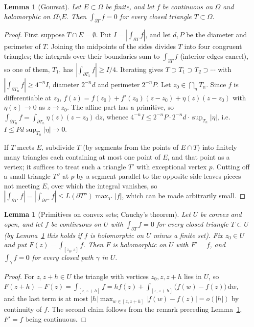\documentclass[11pt]{article}
\newtheorem{lemma}[theorem]{Lemma}
\theoremstyle{definition}
\newcommand{\dd}{\,\mathrm{d}}
\begin{document}
\begin{lemma}[Goursat]\label{lem:goursat}
Let $E\subset\Omega$ be finite, and let $f$ be continuous on $\Omega$ and holomorphic on $\Omega\setminus E$. Then $\int_{\partial T}f=0$ for every closed triangle $T\subset\Omega$.
\end{lemma}
\begin{proof}
First suppose $T\cap E=\emptyset$. Put $I=|\int_{\partial T}f|$, and let $d,P$ be the diameter and perimeter of $T$.
Joining the midpoints of the sides divides $T$ into four congruent triangles; the integrals over their boundaries sum to $\int_{\partial T}f$ (interior edges cancel), so one of them, $T_1$, has $|\int_{\partial T_1}f|\ge I/4$.
Iterating gives $T\supset T_1\supset T_2\supset\cdots$ with $|\int_{\partial T_n}f|\ge4^{-n}I$, diameter $2^{-n}d$ and perimeter $2^{-n}P$.
Let $z_0\in\bigcap_nT_n$. Since $f$ is differentiable at $z_0$, $f(z)=f(z_0)+f'(z_0)(z-z_0)+\eta(z)(z-z_0)$ with $\eta(z)\to0$ as $z\to z_0$.
The affine part has a primitive, so $\int_{\partial T_n}f=\int_{\partial T_n}\eta(z)(z-z_0)\dd z$, whence
$4^{-n}I\le 2^{-n}P\cdot2^{-n}d\cdot\sup_{T_n}|\eta|$, i.e.\ $I\le Pd\sup_{T_n}|\eta|\to0$.

If $T$ meets $E$, subdivide $T$ (by segments from the points of $E\cap T$) into finitely many triangles each containing at most one point of $E$, and that point as a vertex; it suffices to treat such a triangle $T'$ with exceptional vertex $p$.
Cutting off a small triangle $T''$ at $p$ by a segment parallel to the opposite side leaves pieces not meeting $E$, over which the integral vanishes, so $|\int_{\partial T'}f|=|\int_{\partial T''}f|\le L(\partial T'')\max_{T'}|f|$, which can be made arbitrarily small.
\end{proof}

\begin{lemma}[Primitives on convex sets; Cauchy's theorem]\label{lem:primitive}
Let $U$ be convex and open, and let $f$ be continuous on $U$ with $\int_{\partial T}f=0$ for every closed triangle $T\subset U$ (by Lemma~\ref{lem:goursat} this holds if $f$ is holomorphic on $U$ minus a finite set).
Fix $z_0\in U$ and put $F(z)=\int_{[z_0,z]}f$. Then $F$ is holomorphic on $U$ with $F'=f$, and $\int_\gamma f=0$ for every closed path $\gamma$ in $U$.
\end{lemma}
\begin{proof}
For $z,z+h\in U$ the triangle with vertices $z_0,z,z+h$ lies in $U$, so $F(z+h)-F(z)=\int_{[z,z+h]}f=hf(z)+\int_{[z,z+h]}\bigl(f(w)-f(z)\bigr)\dd w$, and the last term is at most $|h|\max_{w\in[z,z+h]}|f(w)-f(z)|=o(|h|)$ by continuity of $f$.
The second claim follows from the remark preceding Lemma~\ref{lem:goursat}, $F'=f$ being continuous.
\end{proof}
\end{document}
